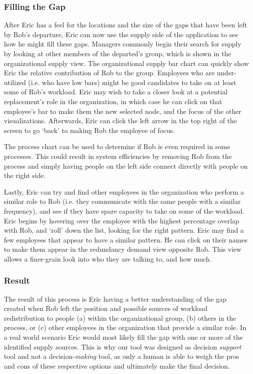 \documentclass[journal]{vgtc}                %
\begin{document}
\subsubsection{Filling the Gap}
After Eric has a feel for the locations and the size of the gaps that have been left by Rob's departure, Eric can now use the supply side of the application to see how he might fill these gaps. Managers commonly begin their search for supply by looking at other members of the departed's group, which is shown in the organizational supply view. The organizational supply bar chart can quickly show Eric the relative contribution of Rob to the group. Employees who are under-utilized (i.e. who have low bars) might be good candidates to take on at least some of Rob's workload. Eric may wish to take a closer look at a potential replacement's role in the organization, in which case he can click on that employee's bar to make them the new selected node, and the focus of the other visualizations. Afterwards, Eric can click the left arrow in the top right of the screen to go \lq back\rq{} to making Rob the employee of focus.

The process chart can be used to determine if Rob is even required in some processes.  This could result in system efficiencies by removing Rob from the process and simply having people on the left side connect directly with people on the right side.

Lastly, Eric can try and find other employees in the organization who perform a similar role to Rob (i.e. they communicate with the same people with a similar frequency), and see if they have spare capacity to take on some of the workload.  Eric begins by hovering over the employee with the highest percentage overlap with Rob, and \lq roll\rq{} down the list, looking for the right pattern. Eric may find a few employees that appear to have a similar pattern. He can click on their names to make them appear in the redundancy demand view opposite Rob. This view allows a finer-grain look into who they are talking to, and how much.

\subsubsection{Result}
The result of this process is Eric having a better understanding of the gap created when Rob left the position and possible sources of workload redistribution to people (a) within the organizational group, (b) others in the process, or (c) other employees in the organization that provide a similar role.
In a real world scenario Eric would most likely fill the gap with one or more of the identified supply sources.  This is why our tool was designed as decision \emph{support} tool and not a decision-\emph{making} tool, as only a human is able to weigh the pros and cons of these respective options and ultimately make the final decision. 
\end{document}
